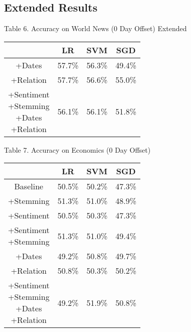 \documentclass[11pt,a4paper]{article}
\begin{document}
\subsection{Extended Results}

\begin{center}
Table 6. Accuracy on World News (0 Day Offset) Extended
\begin{tabular}{ |c|c|c|c| }
 \hline
  & LR & SVM & SGD \\
 \hline
 +Dates & 57.7\% & 56.3\% & 49.4\% \\
  \hline
 +Relation & 57.7\% & 56.6\% & 55.0\% \\
  \hline
  \shortstack{+Sentiment \\ +Stemming \\+Dates \\+Relation} & 56.1\% & 56.1\% & 51.8\% \\
 \hline
\end{tabular}
\end{center}

\begin{center}
Table 7. Accuracy on Economics (0 Day Offset)
\begin{tabular}{ |c|c|c|c| }
 \hline
  & LR & SVM & SGD \\
  \hline
  Baseline & 50.5\% & 50.2\% & 47.3\% \\
  \hline
 +Stemming & 51.3\% & 51.0\% & 48.9\% \\
  \hline
 +Sentiment & 50.5\% & 50.3\%  & 47.3\% \\
  \hline
  \shortstack{+Sentiment \\ +Stemming} & 51.3\% & 51.0\% & 49.4\% \\
 \hline
 +Dates & 49.2\% & 50.8\% & 49.7\% \\
  \hline
 +Relation & 50.8\% & 50.3\% & 50.2\% \\
  \hline
  \shortstack{+Sentiment \\ +Stemming \\+Dates \\+Relation} & 49.2\% & 51.9\% & 50.8\% \\
 \hline
\end{tabular}
\end{center}
\end{document}
